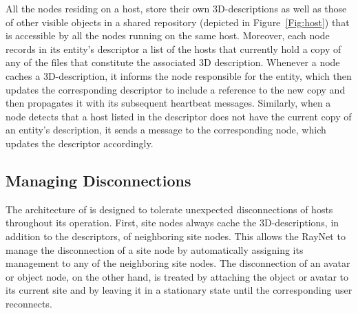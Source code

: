 All the nodes residing on a host, store their own 3D-descriptions as
well as those of other visible objects in a shared repository
(depicted in Figure~\ref{Fig:host}) that is accessible by all the nodes
running on the same host. Moreover, each node records in its
entity's descriptor a list of the hosts that currently hold a copy of
any of the files that constitute the associated 3D description.
Whenever a node caches a 3D-description, it informs the node
responsible for the entity, which then updates the corresponding
descriptor to include a reference to the new copy and then propagates
it with its subsequent heartbeat messages. Similarly, when a
node detects that a host listed in the descriptor does not have the
current copy of an entity's description, it sends a message to the
corresponding node, which updates the descriptor accordingly.

\subsection{Managing Disconnections}
The architecture of \sol is designed to tolerate unexpected
disconnections of hosts throughout its operation. First, site nodes
always cache the 3D-descriptions, in addition to the descriptors, of
neighboring site nodes. This allows the RayNet to manage the
disconnection of a site node by automatically assigning its management
to any of the neighboring site nodes. The disconnection of an avatar
or object node, on the other hand, is treated by attaching the object
or avatar to its current site and by leaving it in a stationary state
until the corresponding user reconnects.









